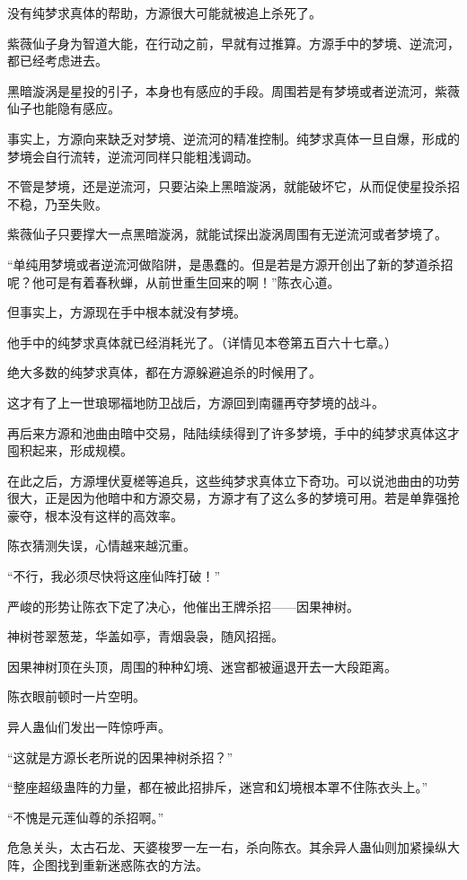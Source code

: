 \begin{this_body}
没有纯梦求真体的帮助，方源很大可能就被追上杀死了。

紫薇仙子身为智道大能，在行动之前，早就有过推算。方源手中的梦境、逆流河，都已经考虑进去。

黑暗漩涡是星投的引子，本身也有感应的手段。周围若是有梦境或者逆流河，紫薇仙子也能隐有感应。

事实上，方源向来缺乏对梦境、逆流河的精准控制。纯梦求真体一旦自爆，形成的梦境会自行流转，逆流河同样只能粗浅调动。

不管是梦境，还是逆流河，只要沾染上黑暗漩涡，就能破坏它，从而促使星投杀招不稳，乃至失败。

紫薇仙子只要撑大一点黑暗漩涡，就能试探出漩涡周围有无逆流河或者梦境了。

“单纯用梦境或者逆流河做陷阱，是愚蠢的。但是若是方源开创出了新的梦道杀招呢？他可是有着春秋蝉，从前世重生回来的啊！”陈衣心道。

但事实上，方源现在手中根本就没有梦境。

他手中的纯梦求真体就已经消耗光了。（详情见本卷第五百六十七章。）

绝大多数的纯梦求真体，都在方源躲避追杀的时候用了。

这才有了上一世琅琊福地防卫战后，方源回到南疆再夺梦境的战斗。

再后来方源和池曲由暗中交易，陆陆续续得到了许多梦境，手中的纯梦求真体这才囤积起来，形成规模。

在此之后，方源埋伏夏槎等追兵，这些纯梦求真体立下奇功。可以说池曲由的功劳很大，正是因为他暗中和方源交易，方源才有了这么多的梦境可用。若是单靠强抢豪夺，根本没有这样的高效率。

陈衣猜测失误，心情越来越沉重。

“不行，我必须尽快将这座仙阵打破！”

严峻的形势让陈衣下定了决心，他催出王牌杀招——因果神树。

神树苍翠葱茏，华盖如亭，青烟袅袅，随风招摇。

因果神树顶在头顶，周围的种种幻境、迷宫都被逼退开去一大段距离。

陈衣眼前顿时一片空明。

异人蛊仙们发出一阵惊呼声。

“这就是方源长老所说的因果神树杀招？”

“整座超级蛊阵的力量，都在被此招排斥，迷宫和幻境根本罩不住陈衣头上。”

“不愧是元莲仙尊的杀招啊。”

危急关头，太古石龙、天婆梭罗一左一右，杀向陈衣。其余异人蛊仙则加紧操纵大阵，企图找到重新迷惑陈衣的方法。


\end{this_body}
